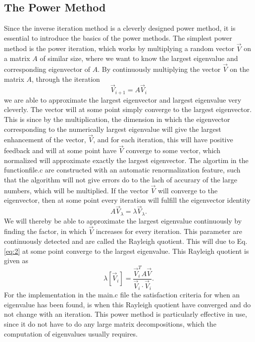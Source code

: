 \documentclass[twocolumn]{article}
\begin{document}
\subsection{\label{sec:1}The Power Method}
Since the inverse iteration method is a cleverly designed power method, it is essential to introduce the basics of the power methods. The simplest power method is the power iteration, which works by multiplying a random vector $\vec{V}$ on a matrix $A$ of similar size, where we want to know the largest eigenvalue and corresponding eigenvector of $A$. By continuously multiplying the vector $\vec{V}$ on the matrix $A$, through the iteration
\begin{equation}
\vec{V}_{i+1} = A \vec{V}_i \label{eq:1}
\end{equation}
we are able to approximate the largest eigenvector and largest eigenvalue very cleverly. The vector will at some point simply converge to the largest eigenvector.  This is since by the multiplication, the dimension in which the eigenvector corresponding to the numerically largest eigenvalue will give the largest enhancement of the vector, $\vec{V}$, and for each iteration, this will have positive feedback and will at some point have $\vec{V}$ converge to some vector, which normalized will approximate exactly the largest eigenvector. The algortim in the functionfile.c are constructed with an automatic renormalization feature, such that the algorithm will not give errors do to the lach of accurary of the large numbers, which will be multiplied. 
 If the vector $\vec{V}$ will converge to the eigenvector, then at some point every iteration will fulfill the eigenvector identity
\begin{equation}
A \vec{V}_\lambda = \lambda \vec{V}_\lambda. \label{eq:2}
\end{equation}
We will thereby be able to approximate the largest eigenvalue continuously by finding the factor, in which $\vec{V}$ increases for every iteration. This parameter are continuously detected and are called the Rayleigh quotient. This will due to Eq. \eqref{eq:2} at some point converge to the largest eigenvalue. This Rayleigh quotient is given as
\begin{equation}
\lambda \left[ \vec{V}_i \right] = \frac{\vec{V}^T_i A \vec{V}}{\vec{V}_i \cdot \vec{V}_i}. \label{eq:3}
\end{equation}
For the implementation in the main.c file the satisfaction criteria for when an eigenvalue has been found, is when this Rayleigh quotient have converged and do not change with an iteration. This power method is particularly effective in use, since it do not have to do any large matrix decompositions, which the computation of eigenvalues usually requires.
\end{document}
